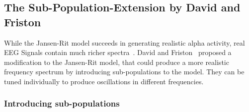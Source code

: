 
\pagebreak

\subsection{The Sub-Population-Extension by David and Friston}\label{subsec:the-david-and-friston-model}

While the Jansen-Rit model succeeds in generating realistic alpha activity,
real EEG Signals contain much richer spectra~\parencite{steriade_impact_2001}.
David and Friston~\cite{david_neural_2003} proposed a modification to the Jansen-Rit model,
that could produce a more realistic frequency spectrum by introducing sub-populations to the model.
They can be tuned individually to produce oscillations in different frequencies.

\subsubsection{Introducing sub-populations}


